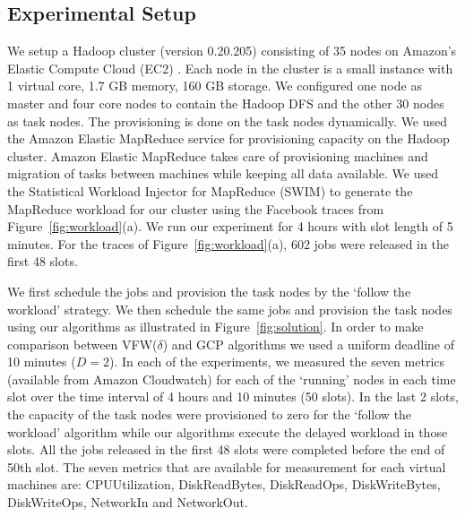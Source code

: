 \documentclass[10pt,conference,compsocconf,letterpaper]{IEEEtran}
\begin{document}
\subsection{Experimental Setup}
We setup a Hadoop cluster (version 0.20.205) consisting of 35 nodes on Amazon's Elastic Compute Cloud (EC2) \cite{n1,n2}. Each node in the cluster is a small instance with 1 virtual core, 1.7 GB memory, 160 GB storage. We configured one node as master and four core nodes to contain the Hadoop DFS and the other 30 nodes as task nodes. The provisioning is done on the task nodes dynamically. We used the Amazon Elastic MapReduce service for provisioning capacity on the Hadoop cluster. Amazon Elastic MapReduce takes care of provisioning machines and migration of tasks between machines while keeping all data available. We used the Statistical Workload Injector for MapReduce (SWIM) \cite{n4} to generate the MapReduce workload for our cluster using the Facebook traces from Figure~\ref{fig:workload}(a). We run our experiment for 4 hours with slot length of 5 minutes. For the traces of Figure~\ref{fig:workload}(a), 602 jobs were released in the first 48 slots.

We first schedule the jobs and provision the task nodes by the `follow the workload' strategy. We then schedule the same jobs and provision the task nodes using our algorithms as illustrated in Figure~\ref{fig:solution}. In order to make comparison between VFW($\delta$) and GCP algorithms we used a uniform deadline of 10 minutes ($D=2$). In each of the experiments, we measured the seven metrics (available from Amazon Cloudwatch) for each of the `running' nodes in each time slot over the time interval of 4 hours and 10 minutes (50 slots). In the last 2 slots, the capacity of the task nodes were provisioned to zero for the `follow the workload' algorithm while our algorithms execute the delayed workload in those slots. All the jobs released in the first 48 slots were completed before the end of 50th slot. The seven metrics that are available for measurement for each virtual machines are: CPUUtilization, DiskReadBytes, DiskReadOps, DiskWriteBytes, DiskWriteOps, NetworkIn and NetworkOut.







\begin{figure*}[!t]
\centerline{
\hfil
{}
\hfil
{}
}
\caption{The solutions for (a) Follow the workload, (b) VFW($\delta$) and (c) GCP-U algorithms with uniform deadline $D=2$ slots, $\delta=1$ and time slot = 5 mins.}
\label{fig:solution}
\end{figure*}
\end{document}
